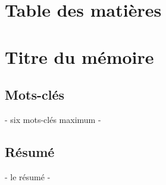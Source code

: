 \documentclass[12pt,a4paper,french,twoside,openright,oldfontcommands,final]{memoir}
\theoremstyle{plain}
\theoremstyle{definition}
\begin{document}
\frontmatter





\clearpage



% 
% 


\chapter*{ Table des matières}

\makeatletter
{}
\makeatother


\mainmatter
\renewcommand{\chaptermark}[1]{\markboth{\textsc{#1}}{\textsc{#1}}} 



\renewcommand{\chaptermark}[1]{\markboth{\textsc{\chaptername~\thechapter{} -- #1}}{}} 
\renewcommand{\sectionmark}[1]{\markright{\textsc{\thesection{} #1}}}







\renewcommand{\chaptermark}[1]{\markboth{\textsc{#1}}{\textsc{#1}}} 

 


\backmatter{}
\setcounter{page}{1}

\nocite{*}
\small


\normalsize


\cleardoublepage{}

\chapter*{ Titre du mémoire}


\section*{ Mots-clés}
- six mots-clés maximum -

\section*{ Résumé}
- le résumé - 

\thispagestyle{empty}
\end{document}
